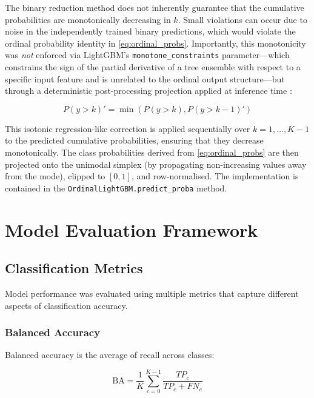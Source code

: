 The binary reduction method does not inherently guarantee that the cumulative probabilities are monotonically decreasing in $k$. Small violations can occur due to noise in the independently trained binary predictions, which would violate the ordinal probability identity in \eqref{eq:ordinal_probs}. Importantly, this monotonicity was \emph{not} enforced via LightGBM's \texttt{monotone\_constraints} parameter---which constrains the sign of the partial derivative of a tree ensemble with respect to a specific input feature and is unrelated to the ordinal output structure---but through a deterministic post-processing projection applied at inference time \parencite{barlow_statistical_1972}:

\begin{equation}
    P(y > k)' = \min(P(y > k), P(y > k-1)')
    \label{eq:monotonic}
\end{equation}

This isotonic regression-like correction is applied sequentially over $k = 1, \ldots, K-1$ to the predicted cumulative probabilities, ensuring that they decrease monotonically. The class probabilities derived from \eqref{eq:ordinal_probs} are then projected onto the unimodal simplex (by propagating non-increasing values away from the mode), clipped to $[0, 1]$, and row-normalised. The implementation is contained in the \texttt{OrdinalLightGBM.predict\_proba} method.


\section{Model Evaluation Framework}\label{sec:methods:evaluation}

\subsection{Classification Metrics}

Model performance was evaluated using multiple metrics that capture different aspects of classification accuracy.

\subsubsection{Balanced Accuracy}

Balanced accuracy is the average of recall across classes:

\begin{equation}
    \text{BA} = \frac{1}{K} \sum_{c=0}^{K-1} \frac{TP_c}{TP_c + FN_c}
    \label{eq:balanced_accuracy}
\end{equation}

